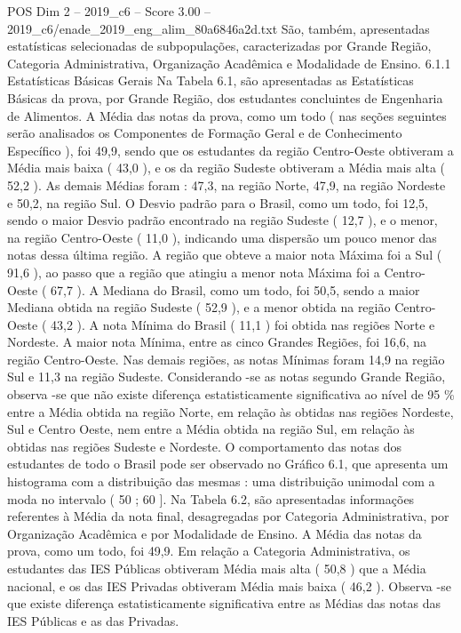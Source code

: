 \begin{textsample}{POS Dim 2 – 2019\_c6 – Score 3.00 – 2019\_c6/enade\_2019\_eng\_alim\_80a6846a2d.txt}
São, também, apresentadas estatísticas selecionadas de subpopulações, caracterizadas por Grande Região, Categoria Administrativa, Organização Acadêmica e Modalidade de Ensino. 6.1.1 Estatísticas Básicas Gerais Na Tabela 6.1, são apresentadas as Estatísticas Básicas da prova, por Grande Região, dos estudantes concluintes de Engenharia de Alimentos.
A Média das notas da prova, como um todo ( nas seções seguintes serão analisados os Componentes de Formação Geral e de Conhecimento Específico ), foi 49,9, sendo que os estudantes da região Centro-Oeste obtiveram a Média mais baixa ( 43,0 ), e os da região Sudeste obtiveram a Média mais alta ( 52,2 ).
As demais Médias foram : 47,3, na região Norte, 47,9, na região Nordeste e 50,2, na região Sul.
O Desvio padrão para o Brasil, como um todo, foi 12,5, sendo o maior Desvio padrão encontrado na região Sudeste ( 12,7 ), e o menor, na região Centro-Oeste ( 11,0 ), indicando uma dispersão um pouco menor das notas dessa última região.
A região que obteve a maior nota Máxima foi a Sul ( 91,6 ), ao passo que a região que atingiu a menor nota Máxima foi a Centro-Oeste ( 67,7 ).
A Mediana do Brasil, como um todo, foi 50,5, sendo a maior Mediana obtida na região Sudeste ( 52,9 ), e a menor obtida na região Centro-Oeste ( 43,2 ).
A nota Mínima do Brasil ( 11,1 ) foi obtida nas regiões Norte e Nordeste.
A maior nota Mínima, entre as cinco Grandes Regiões, foi 16,6, na região Centro-Oeste.
Nas demais regiões, as notas Mínimas foram 14,9 na região Sul e 11,3 na região Sudeste.
Considerando -se as notas segundo Grande Região, observa -se que não existe diferença estatisticamente significativa ao nível de 95 \% entre a Média obtida na região Norte, em relação às obtidas nas regiões Nordeste, Sul e Centro Oeste, nem entre a Média obtida na região Sul, em relação às obtidas nas regiões Sudeste e Nordeste.
O comportamento das notas dos estudantes de todo o Brasil pode ser observado no Gráfico 6.1, que apresenta um histograma com a distribuição das mesmas : uma distribuição unimodal com a moda no intervalo ( 50 ; 60 ].
Na Tabela 6.2, são apresentadas informações referentes à Média da nota final, desagregadas por Categoria Administrativa, por Organização Acadêmica e por Modalidade de Ensino.
A Média das notas da prova, como um todo, foi 49,9.
Em relação a Categoria Administrativa, os estudantes das IES Públicas obtiveram Média mais alta ( 50,8 ) que a Média nacional, e os das IES Privadas obtiveram Média mais baixa ( 46,2 ).
Observa -se que existe diferença estatisticamente significativa entre as Médias das notas das IES Públicas e as das Privadas.

\end{textsample}
